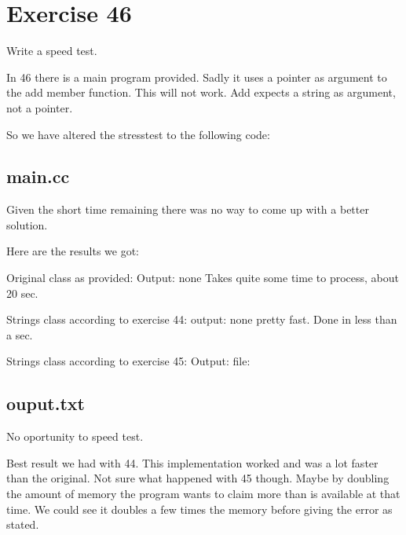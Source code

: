 \section{Exercise 46}
\begin{question}
    Write a speed test.
\end{question}

\begin{solution}
In 46 there is a main program provided.
Sadly it uses a pointer as argument to the add member function.
This will not work. Add expects a string as argument, not a pointer.

So we have altered the stresstest to the following code:

    \subsection{main.cc}

Given the short time remaining there was no way to come up with a better solution.

Here are the results we got:

Original class as provided:
Output: none
Takes quite some time to process, about 20 sec.

Strings class according to exercise 44:
output: none
pretty fast. Done in less than a sec.

Strings class according to exercise 45:
Output: file: 
    \subsection{ouput.txt}
No oportunity to speed test.

Best result we had with 44. This implementation worked and was a lot faster than
the original. 
Not sure what happened with 45 though. Maybe by doubling the amount of memory 
the program wants to claim more than is available at that time. We could see it doubles
a few times the memory before giving the error as stated.

\end{solution}
